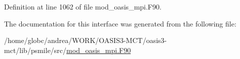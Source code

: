 Definition at line 1062 of file mod\+\_\+oasis\+\_\+mpi.\+F90.



The documentation for this interface was generated from the following file\+:\begin{DoxyCompactItemize}
\item 
/home/globc/andrea/\+W\+O\+R\+K/\+O\+A\+S\+I\+S3-\/\+M\+C\+T/oasis3-\/mct/lib/psmile/src/\hyperlink{mod__oasis__mpi_8_f90}{mod\+\_\+oasis\+\_\+mpi.\+F90}\end{DoxyCompactItemize}
